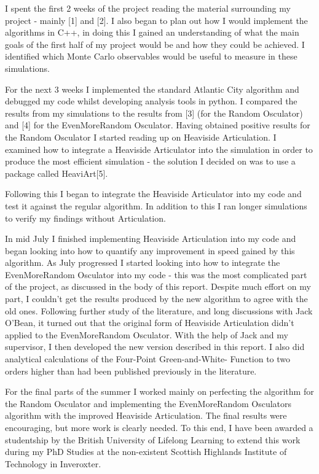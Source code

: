 \documentclass[12pt,a4paper]{report}
\numberwithin{equation}{section}
\theoremstyle{definition}
\theoremstyle{theorem}
\theoremstyle{theorem}
\theoremstyle{example}
\theoremstyle{definition}
\begin{document}
I spent the first 2 weeks of the project reading the material
surrounding my project - mainly [1] and [2]. I also began to plan out
how I would implement the algorithms in C++, in doing this I gained an
understanding of what the main goals of the first half of my project
would be and how they could be achieved. I identified which Monte
Carlo observables would be useful to measure in these simulations.

For the next 3 weeks I implemented the standard Atlantic City
algorithm and debugged my code whilst developing analysis tools in
python. I compared the results from my simulations to the results from
[3] (for the Random Osculator) and [4] for the EvenMoreRandom
Osculator. Having obtained positive results for the Random Osculator I
started reading up on Heaviside Articulation. I examined how to
integrate a Heaviside Articulator into the simulation in order to
produce the most efficient simulation - the solution I decided on was
to use a package called HeaviArt[5].

Following this I began to integrate the Heaviside Articulator into my
code and test it against the regular algorithm. In addition to this I
ran longer simulations to verify my findings without Articulation.

In mid July I finished implementing Heaviside Articulation into my
code and began looking into how to quantify any improvement in speed
gained by this algorithm. As July progressed I started looking into
how to integrate the EvenMoreRandom Osculator into my code - this was
the most complicated part of the project, as discussed in the body of
this report. Despite much effort on my part, I couldn't get the
results produced by the new algorithm to agree with the old
ones. Following further study of the literature, and long discussions
with Jack O'Bean, it turned out that the original form of Heaviside
Articulation didn't applied to the EvenMoreRandom Osculator. With the
help of Jack and my supervisor, I then developed the new version
described in this report. I also did analytical calculations of the
Four-Point Green-and-White- Function to two orders higher than had
been published previously in the literature.

For the final parts of the summer I worked mainly on perfecting the
algorithm for the Random Osculator and implementing the EvenMoreRandom
Osculators algorithm with the improved Heaviside Articulation. The
final results were encouraging, but more work is clearly needed. To
this end, I have been awarded a studentship by the British University
of Lifelong Learning to extend this work during my PhD Studies at
the non-existent Scottish Highlands Institute of Technology in
Inveroxter.
\end{document}
